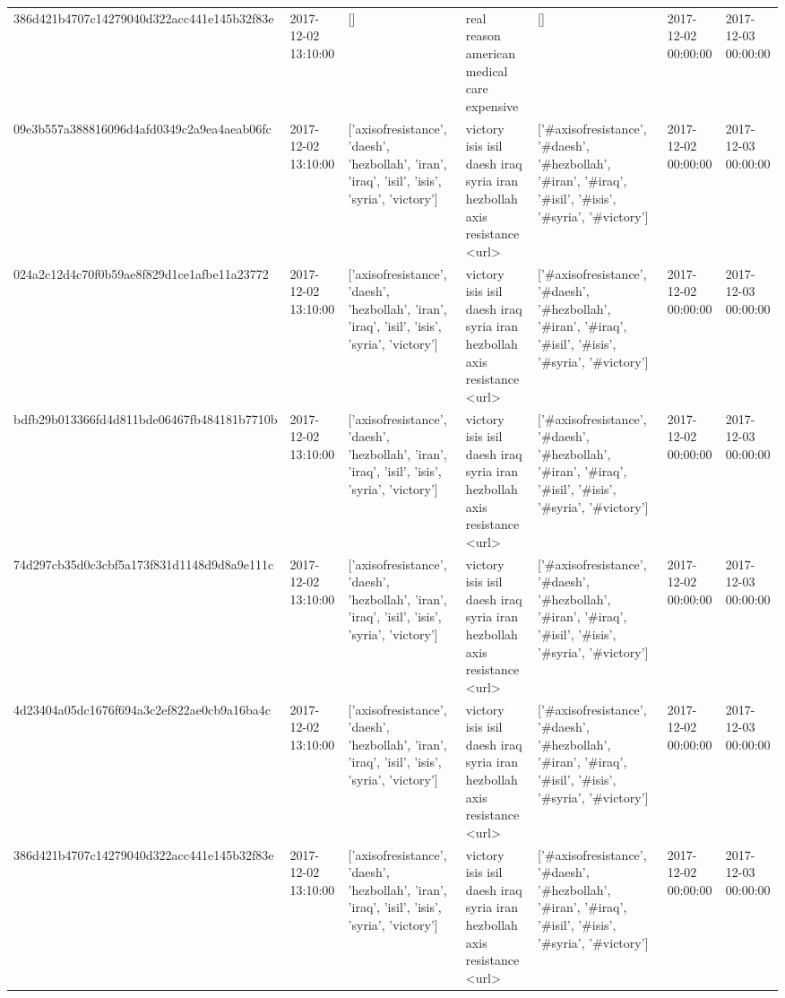 \begin{tabular}{lllllll}
386d421b4707c14279040d322acc441e145b32f83e & 2017-12-02 13:10:00 & [] & real reason american medical care expensive & [] & 2017-12-02 00:00:00 & 2017-12-03 00:00:00 \\
09e3b557a388816096d4afd0349c2a9ea4aeab06fc & 2017-12-02 13:10:00 & ['axisofresistance', 'daesh', 'hezbollah', 'iran', 'iraq', 'isil', 'isis', 'syria', 'victory'] & victory isis isil daesh iraq syria iran hezbollah axis resistance <url> & ['#axisofresistance', '#daesh', '#hezbollah', '#iran', '#iraq', '#isil', '#isis', '#syria', '#victory'] & 2017-12-02 00:00:00 & 2017-12-03 00:00:00 \\
024a2c12d4c70f0b59ae8f829d1ce1afbe11a23772 & 2017-12-02 13:10:00 & ['axisofresistance', 'daesh', 'hezbollah', 'iran', 'iraq', 'isil', 'isis', 'syria', 'victory'] & victory isis isil daesh iraq syria iran hezbollah axis resistance <url> & ['#axisofresistance', '#daesh', '#hezbollah', '#iran', '#iraq', '#isil', '#isis', '#syria', '#victory'] & 2017-12-02 00:00:00 & 2017-12-03 00:00:00 \\
bdfb29b013366fd4d811bde06467fb484181b7710b & 2017-12-02 13:10:00 & ['axisofresistance', 'daesh', 'hezbollah', 'iran', 'iraq', 'isil', 'isis', 'syria', 'victory'] & victory isis isil daesh iraq syria iran hezbollah axis resistance <url> & ['#axisofresistance', '#daesh', '#hezbollah', '#iran', '#iraq', '#isil', '#isis', '#syria', '#victory'] & 2017-12-02 00:00:00 & 2017-12-03 00:00:00 \\
74d297cb35d0c3cbf5a173f831d1148d9d8a9e111c & 2017-12-02 13:10:00 & ['axisofresistance', 'daesh', 'hezbollah', 'iran', 'iraq', 'isil', 'isis', 'syria', 'victory'] & victory isis isil daesh iraq syria iran hezbollah axis resistance <url> & ['#axisofresistance', '#daesh', '#hezbollah', '#iran', '#iraq', '#isil', '#isis', '#syria', '#victory'] & 2017-12-02 00:00:00 & 2017-12-03 00:00:00 \\
4d23404a05dc1676f694a3c2ef822ae0cb9a16ba4c & 2017-12-02 13:10:00 & ['axisofresistance', 'daesh', 'hezbollah', 'iran', 'iraq', 'isil', 'isis', 'syria', 'victory'] & victory isis isil daesh iraq syria iran hezbollah axis resistance <url> & ['#axisofresistance', '#daesh', '#hezbollah', '#iran', '#iraq', '#isil', '#isis', '#syria', '#victory'] & 2017-12-02 00:00:00 & 2017-12-03 00:00:00 \\
386d421b4707c14279040d322acc441e145b32f83e & 2017-12-02 13:10:00 & ['axisofresistance', 'daesh', 'hezbollah', 'iran', 'iraq', 'isil', 'isis', 'syria', 'victory'] & victory isis isil daesh iraq syria iran hezbollah axis resistance <url> & ['#axisofresistance', '#daesh', '#hezbollah', '#iran', '#iraq', '#isil', '#isis', '#syria', '#victory'] & 2017-12-02 00:00:00 & 2017-12-03 00:00:00 \\

\end{tabular}
